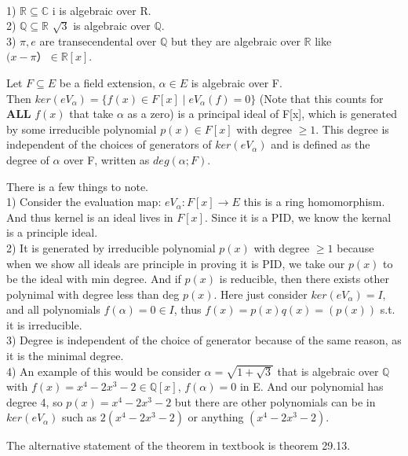 \documentclass{article}
\newcommand\R{\ensuremath{\mathbb{R}}}
\newcommand\Q{\ensuremath{\mathbb{Q}}}
\newcommand\C{\ensuremath{\mathbb{C}}}
\begin{document}
\begin{Example}
\\ 1) $\R \subseteq \C$ i is algebraic over R. 
\\ 2) $\Q \subseteq \R$ $\sqrt{3}$ is algebraic over $\Q$.
\\ 3) $\pi, e$ are transecendental over $\Q$ but they are algebraic over $\R$ like $(x - \pi）\in \R[x] $.
\end{Example}

\begin{theorem}
    Let $F \subseteq E$ be a field extension, $\alpha 
    \in E$ is algebraic over F.
\\ Then $ker(eV_\alpha) = \{ f(x) \in F[x] \mid eV_\alpha(f) = 0\}$ (Note that this counts for \textbf{ALL} $f(x)$ that take $\alpha$ as a zero) is a principal ideal of F[x], which is generated by some irreducible polynomial $p(x) \in F[x]$ with degree $\geq 1$. This degree is independent of the choices of generators of $ker(eV_\alpha)$ and is defined as the degree of $\alpha$ over F, written as $deg(\alpha;F)$.
\end{theorem}

\begin{note}
    There is a few things to note.
\\ 1) Consider the evaluation map: $eV_\alpha: F[x] \rightarrow E$ this is a ring homomorphism. And thus kernel is an ideal lives in $F[x]$. Since it is a PID, we know the kernal is a principle ideal. 
\\ 2) It is generated by irreducible polynomial $p(x)$ with degree $\geq 1$ because when we show all ideals are principle in proving it is PID, we take our $p(x)$ to be the ideal with min degree.
And if $p(x)$ is reducible, then there exists other polynimal with degree less than deg $ p(x)$.
Here just consider $ker(eV_\alpha) = I$, and all polynomials $f(\alpha) = 0 \in I$, thus $f(x) = p(x) q(x) = (p(x))$ s.t. it is irreducible.
\\3) Degree is independent of the choice of generator because of the same reason, as it is the minimal degree.
\\4) An example of this would be consider $\alpha = \sqrt{1+ \sqrt{3}}$ that is algebraic over $\Q$ with $f(x) = x^4 -2x^3 -2 \in \Q[x]$, $f(\alpha) = 0$ in E. And our polynomial has degree 4, so $p(x) =x^4 -2x^3 -2 $ but there are other polynomials can be in $ker(eV_\alpha)$ such as $2(x^4 -2x^3 -2)$ or anything $(x^4 -2x^3 -2)$.
\end{note}

The alternative statement of the theorem in textbook is theorem 29.13.
\end{document}
